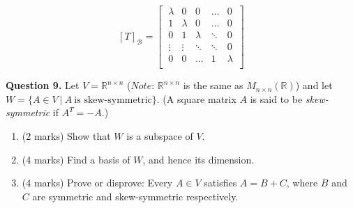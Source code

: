 \documentclass{article}
\newcommand{\R}{\mathbb{R}}
\begin{document}
$$[T]_\mathcal{B} = \begin{bmatrix}
    \ \lambda & 0 & 0 & \ldots & 0 \ \\
    \ 1 & \lambda & 0 & \ldots & 0 \ \\
    \ 0 & 1 & \lambda & \ddots & 0 \ \\
    \ \vdots & \vdots & \ddots & \ddots & 0 \ \\
    \ 0 & 0 & \ldots & 1 & \lambda \\
\end{bmatrix}$$


\textbf{Question 9.} Let $V = \R^{n \times n}$ ($Note$: $\R^{n \times n}$ is the same as $M_{n \times n}(\R)$) and let $W = \{ A \in V\ |\ A\ \text{is skew-symmetric} \}$.
(A square matrix $A$ is said to be \textit{skew-symmetric} if $A^T = -A$.)

\begin{enumerate}[label=(\alph*), leftmargin=6.25mm]
    \item (2 marks) Show that $W$ is a subspace of $V$.
    \item (4 marks) Find a basis of $W$, and hence its dimension.
    \item (4 marks) Prove or disprove: Every $A \in V$ satisfies $A = B + C$, where $B$ and $C$ are symmetric and skew-symmetric respectively.
\end{enumerate}
\end{document}

